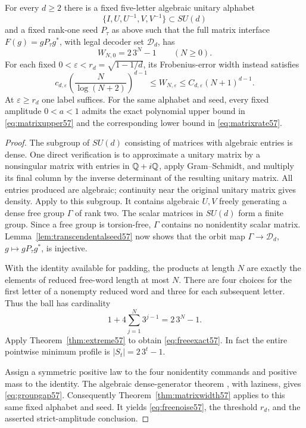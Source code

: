 \begin{theorem}
\label{thm:freeendpoint57}
For every $d\ge2$ there is a fixed five-letter algebraic unitary alphabet
\[
                       \{I,U,U^{-1},V,V^{-1}\}\subset SU(d)
\]
and a fixed rank-one seed $P_\tau$ as above such that the full matrix
interface $F(g)=gP_\tau g^*$, with legal decoder set $\mathcal D_d$, has
\begin{equation}\label{eq:freeexact57}
                      W_{N,0}=2\,3^N-1\qquad(N\ge0).
\end{equation}
For each fixed $0<\varepsilon<r_d=\sqrt{1-1/d}$, its Frobenius-error width
instead satisfies
\begin{equation}\label{eq:freenoise57}
 c_{d,\varepsilon}\left(\frac{N}{\log(N+2)}\right)^{d-1}
 \le W_{N,\varepsilon}\le C_{d,\varepsilon}(N+1)^{d-1}.
\end{equation}
At $\varepsilon\ge r_d$ one label suffices. For the same alphabet and seed,
every fixed amplitude $0<a<1$ admits the exact polynomial upper bound in
\eqref{eq:matrixupper57} and the corresponding lower bound in
\eqref{eq:matrixrate57}.
\end{theorem}
\begin{proof}
The subgroup of $SU(d)$ consisting of matrices with algebraic entries is
dense. One direct verification is to approximate a unitary matrix by a
nonsingular matrix with entries in $\mathbb Q+i\mathbb Q$, apply Gram--Schmidt, and
multiply its final column by the inverse determinant of the resulting
unitary matrix. All entries produced are algebraic; continuity near the
original unitary matrix gives density. Apply
\cite[Theorem~1.1]{BreuillardGelander57} to this subgroup. It contains
algebraic $U,V$ freely generating a dense free group $\Gamma$ of rank two.
The scalar matrices in $SU(d)$ form a finite group. Since a free group is
torsion-free, $\Gamma$ contains no nonidentity scalar matrix.
Lemma~\ref{lem:transcendentalseed57} now shows that the orbit map
$\Gamma\to\mathcal D_d$, $g\mapsto gP_\tau g^*$, is injective.

With the identity available for padding, the products at length $N$ are
exactly the elements of reduced free-word length at most $N$. There are
four choices for the first letter of a nonempty reduced word and three
for each subsequent letter. Thus the ball has cardinality
\[
               1+4\sum_{j=1}^N3^{j-1}=2\,3^N-1.
\]
Apply Theorem~\ref{thm:extreme57} to obtain \eqref{eq:freeexact57}. In fact the
entire pointwise minimum profile is $|S_t|=2\,3^t-1$.

Assign a symmetric positive law to the four nonidentity commands and
positive mass to the identity. The algebraic dense-generator theorem
\cite{BG2012}, with laziness, gives \eqref{eq:groupgap57}. Consequently
Theorem~\ref{thm:matrixwidth57} applies to this same fixed alphabet and
seed. It yields \eqref{eq:freenoise57}, the threshold $r_d$, and the asserted
strict-amplitude conclusion.
\end{proof}
